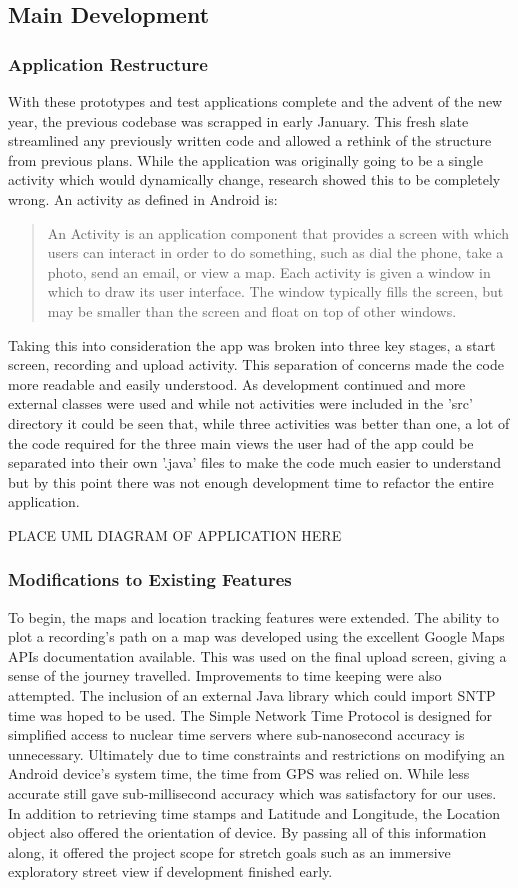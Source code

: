 \documentclass{l3proj}
\begin{document}
\subsection{Main Development}
\subsubsection{Application Restructure}
With these prototypes and test applications complete and the advent of the new year, the previous codebase was scrapped in early January. This fresh slate streamlined any previously written code and allowed a rethink of the structure from previous plans. While the application was originally going to be a single activity which would dynamically change, research showed this to be completely wrong. An activity as defined in Android is:

\blockquote{An Activity is an application component that provides a screen with which users can interact in order to do something, such as dial the phone, take a photo, send an email, or view a map. Each activity is given a window in which to draw its user interface. The window typically fills the screen, but may be smaller than the screen and float on top of other windows.}

Taking this into consideration the app was broken into three key stages, a start screen, recording and upload activity. This separation of concerns made the code more readable and easily understood. As development continued and more external classes were used and while not activities were included in the 'src' directory it could be seen that, while three activities was better than one, a lot of the code required for the three main views the user had of the app could be separated into their own '.java' files to make the code much easier to understand but by this point there was not enough development time to refactor the entire application.

PLACE UML DIAGRAM OF APPLICATION HERE

\subsubsection{Modifications to Existing Features}
To begin, the maps and location tracking features were extended. The ability to plot a recording's path on a map was developed using the excellent Google Maps APIs documentation available. This was used on the final upload screen, giving a sense of the journey travelled. Improvements to time keeping were also attempted. The inclusion of an external Java library which could import SNTP time was hoped to be used. The Simple Network Time Protocol is designed for simplified access to nuclear time servers where sub-nanosecond accuracy is unnecessary. Ultimately due to time constraints and restrictions on modifying an Android device's system time, the time from GPS was relied on. While less accurate still gave sub-millisecond accuracy which was satisfactory for our uses. In addition to retrieving time stamps and Latitude and Longitude, the Location object also offered the orientation of device. By passing all of this information along, it offered the project scope for stretch goals such as an immersive exploratory street view if development finished early.
\end{document}
